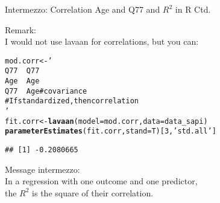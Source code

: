 \documentclass[10pt]{beamer}\usepackage[]{graphicx}\usepackage[]{xcolor}
\makeatletter
\newcommand{\hlnum}[1]{\textcolor[rgb]{0.686,0.059,0.569}{#1}}%
\newcommand{\hlsng}[1]{\textcolor[rgb]{0.192,0.494,0.8}{#1}}%
\newcommand{\hldef}[1]{\textcolor[rgb]{0.345,0.345,0.345}{#1}}%
\newcommand{\hlkwb}[1]{\textcolor[rgb]{0.69,0.353,0.396}{#1}}%
\newcommand{\hlkwc}[1]{\textcolor[rgb]{0.333,0.667,0.333}{#1}}%
\newcommand{\hlkwd}[1]{\textcolor[rgb]{0.737,0.353,0.396}{\textbf{#1}}}%
\newenvironment{kframe}{%
 \def\at@end@of@kframe{}%
 \ifinner\ifhmode%
  \def\at@end@of@kframe{\end{minipage}}%
  \begin{minipage}{\columnwidth}%
 \fi\fi%
 \def\FrameCommand##1{\hskip\@totalleftmargin \hskip-\fboxsep
 \colorbox{shadecolor}{##1}\hskip-\fboxsep
     \hskip-\linewidth \hskip-\@totalleftmargin \hskip\columnwidth}%
 \MakeFramed {\advance\hsize-\width
   \@totalleftmargin\z@ \linewidth\hsize
   \@setminipage}}%
 {\par\unskip\endMakeFramed%
 \at@end@of@kframe}
\newenvironment{knitrout}{}{} %
\makeatother
\begin{document}
\begin{frame}[fragile]{Intermezzo: Correlation Age and Q77 and $R^2$ in R Ctd.}

Remark:\\
I would not use lavaan for correlations, but you can:
\begin{knitrout}
\color{fgcolor}\begin{kframe}
\begin{alltt}
\hldef{mod.corr} \hlkwb{<-} \hlsng{'
  Q77 ~~ Q77
  Age ~~ Age
  Q77 ~~ Age # covariance
  # If standardized, then correlation
'}
\hldef{fit.corr} \hlkwb{<-} \hlkwd{lavaan}\hldef{(}\hlkwc{model} \hldef{= mod.corr,} \hlkwc{data} \hldef{= data_sapi)}
\hlkwd{parameterEstimates}\hldef{(fit.corr,} \hlkwc{stand}\hldef{=T)[}\hlnum{3}\hldef{,}\hlsng{'std.all'}\hldef{]}
\end{alltt}
\begin{verbatim}
## [1] -0.2080665
\end{verbatim}
\end{kframe}
\end{knitrout}

Message intermezzo:\\
In a regression with one outcome and one predictor,\\
the $R^2$ is the square of their correlation.
\end{frame}
%
\end{document}
